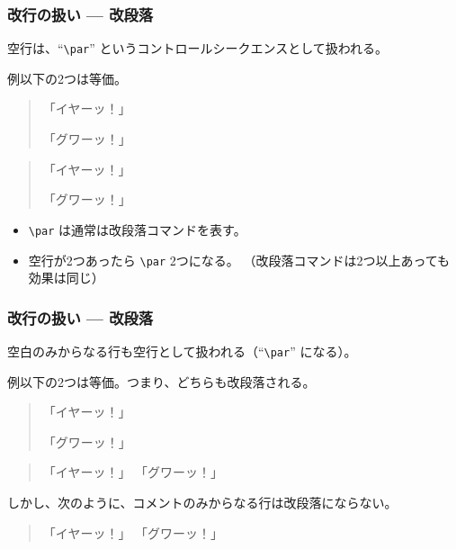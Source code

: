 \documentclass{beamer}
\begin{document}
\begin{frame}[fragile]\frametitle{改行の扱い --- 改段落}
空行は、``\texttt{\textbackslash par}'' というコントロールシークエンスとして扱われる。
\begin{block}{例}以下の2つは等価。
\begin{quote}
\begin{MyCode}
「イヤーッ！」

「グワーッ！」
\end{MyCode}
\end{quote}
  \begin{quote}
\begin{MyCode}
「イヤーッ！」
\par
「グワーッ！」
\end{MyCode}
\end{quote}
\end{block}
\begin{itemize}
\item \texttt{\textbackslash par} は通常は改段落コマンドを表す。
\item 空行が2つあったら \texttt{\textbackslash par} 2つになる。
  （改段落コマンドは2つ以上あっても効果は同じ）
\end{itemize}
\end{frame}

\begin{frame}[fragile]\frametitle{改行の扱い --- 改段落}
空白のみからなる行も空行として扱われる（``\texttt{\textbackslash par}'' になる）。
\begin{block}{例}以下の2つは等価。つまり、どちらも改段落される。
\begin{quote}
\begin{MyCode}
「イヤーッ！」

「グワーッ！」
\end{MyCode}
\end{quote}
  \begin{quote}
\begin{MyCodeAllTT}
「イヤーッ！」
\textvisiblespace\textvisiblespace\textvisiblespace
「グワーッ！」
\end{MyCodeAllTT}
\end{quote}
しかし、次のように、コメントのみからなる行は改段落にならない。
  \begin{quote}
\begin{MyCode}
「イヤーッ！」
%
「グワーッ！」
\end{MyCode}
\end{quote}
\end{block}
\end{frame}
\end{document}
